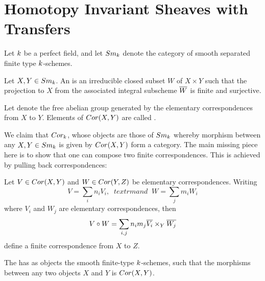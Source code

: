 \newpage
\section{Homotopy Invariant Sheaves with Transfers}\label{sect_hist}

Let $k$ be a perfect field, and let $Sm_{k}$ denote the 
category of smooth separated finite type $k$-schemes.

\begin{defn}\label{def_cor}
Let $X, Y \in Sm_{k}$. An  is an irreducible closed subset $W$ of $X \times Y$ such that 
the projection to $X$ from the associated integral subscheme 
$\overline{W}$ is finite and surjective.

Let  denote the free abelian group generated by 
the elementary correspondences from $X$ to $Y$. Elements of 
$Cor(X, Y)$ are called .
\end{defn}

We claim that $Cor_{k}$, whose objects are those of $Sm_{k}$
whereby morphism between any $X, Y \in Sm_{k}$ is given by $Cor(X, Y)$
form a category. The main missing piece here is to show that one
can compose two finite correspondences. This is achieved by pulling
back correspondences:

%
%
\begin{lem}\label{lem_cor_composition}
Let $V \in Cor(X, Y)$ and $W \in Cor(Y, Z)$ be elementary 
correspondences. Writing
\[
V = \sum_i n_i V_i, \;\;textrm{and}\;\; W = \sum_j m_i W_i
\]
where $V_i$ and $W_j$ are elementary correspondences, then
\[
V \circ W = \sum_{i, j} n_im_j \overline{V_i} \times_Y \overline{W_j}
\]
define a finite correspondence from $X$ to $Z$.
\end{lem}

\begin{defn}
The  has as objects 
the smooth finite-type $k$-schemes, such that the 
morphisms between any two objects $X$ and $Y$ is $Cor(X, Y)$.
\end{defn}

